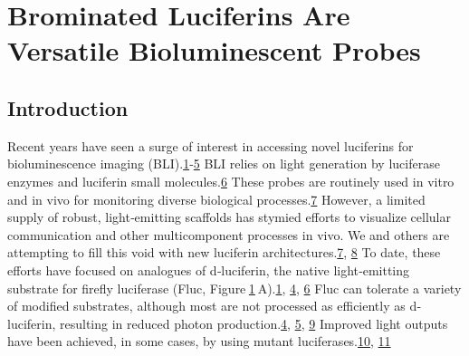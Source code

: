 
\chapter{Brominated Luciferins Are Versatile Bioluminescent
Probes}
\section{Introduction}
Recent years have seen a surge of interest in accessing novel luciferins
for bioluminescence imaging
(BLI).{\protect\hyperlink{cbic201600564-bib-0001}{1}-\protect\hyperlink{cbic201600564-bib-0005}{5}}
BLI relies on light generation by luciferase enzymes and luciferin small
molecules.{\protect\hyperlink{cbic201600564-bib-0006}{6}} These probes
are routinely used in vitro and in vivo for monitoring diverse
biological processes.{\protect\hyperlink{cbic201600564-bib-0007}{7}}
However, a limited supply of robust, light‐emitting scaffolds has
stymied efforts to visualize cellular communication and other
multicomponent processes in vivo. We and others are attempting to fill
this void with new luciferin
architectures.{\protect\hyperlink{cbic201600564-bib-0007}{7},
\protect\hyperlink{cbic201600564-bib-0008}{8}} To date, these efforts
have focused on analogues of {d}‐luciferin, the native light‐emitting
substrate for firefly luciferase (Fluc,
Figure \protect\hyperlink{cbic201600564-fig-0001}{1} A).{\protect\hyperlink{cbic201600564-bib-0001}{1},
\protect\hyperlink{cbic201600564-bib-0004}{4},
\protect\hyperlink{cbic201600564-bib-0006}{6}} Fluc can tolerate a
variety of modified substrates, although most are not processed as
efficiently as {d}‐luciferin, resulting in reduced photon
production.{\protect\hyperlink{cbic201600564-bib-0004}{4},
\protect\hyperlink{cbic201600564-bib-0005}{5},
\protect\hyperlink{cbic201600564-bib-0009}{9}} Improved light outputs
have been achieved, in some cases, by using mutant
luciferases.{\protect\hyperlink{cbic201600564-bib-0010}{10},
\protect\hyperlink{cbic201600564-bib-0011}{11}}

